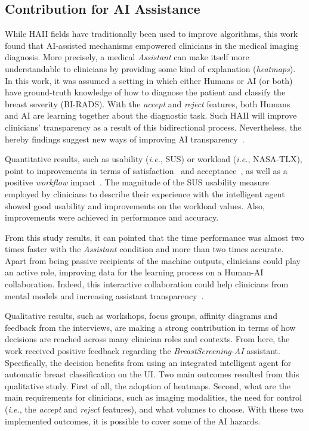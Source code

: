 \subsection{Contribution for AI Assistance}
\label{sec:chap005007002}

While \ac{HAII} fields have traditionally been used to improve algorithms, this work found that \ac{AI}-assisted mechanisms empowered clinicians in the medical imaging diagnosis.
More precisely, a medical {\it Assistant} can make itself more understandable to clinicians by providing some kind of explanation ({\it heatmaps}).
In this work, it was assumed a setting in which either Humans or \ac{AI} (or both) have ground-truth knowledge of how to diagnose the patient and classify the breast severity (\ac{BI-RADS}).
With the {\it accept} and {\it reject} features, both Humans and \ac{AI} are learning together about the diagnostic task.
Such \ac{HAII} will improve clinicians' transparency as a result of this bidirectional process.
Nevertheless, the hereby findings suggest new ways of improving \ac{AI} transparency~\cite{Cai:2019:EEE:3301275.3302289}.

Quantitative results, such as usability ({\it i.e.}, \ac{SUS}) or workload ({\it i.e.}, \ac{NASA-TLX}), point to improvements in terms of satisfaction~\cite{Bonham:2019:ARS:3308557.3308726} and acceptance~\cite{Sonntag:2012:RMD:2166966.2167031, Gambino:2019:DDR:3290607.3312916}, as well as a positive {\it workflow} impact~\cite{DeBackere:2015:DPR:2826165.2826229}.
The magnitude of the \ac{SUS} usability measure employed by clinicians to describe their experience with the intelligent agent showed good usability and improvements on the workload values.
Also, improvements were achieved in performance and accuracy.

From this study results, it can pointed that the time performance was almost two times faster with the {\it Assistant} condition and more than two times accurate.
Apart from being passive recipients of the machine outputs, clinicians could play an active role, improving data for the learning process on a Human-\ac{AI} collaboration.
Indeed, this interactive collaboration could help clinicians from mental models and increasing assistant transparency~\cite{amershi2014power, Cai:2019:HTC:3290605.3300234, Eslami:2016:FIL:2858036.2858494}.

Qualitative results, such as workshops, focus groups, affinity diagrams and feedback from the interviews, are making a strong contribution in terms of how decisions are rea\-ched across many clinician roles and contexts.
From here, the work received positive feedback regarding the {\it BreastScreening-AI} assistant.
Specifically, the decision benefits from using an integrated intelligent agent for automatic breast classification on the \ac{UI}.
Two main outcomes resulted from this qualitative study.
First of all, the adoption of heatmaps.
Second, what are the main requirements for clinicians, such as imaging modalities, the need for control ({\it i.e.}, the {\it accept} and {\it reject} features), and what volumes to choose.
With these two implemented outcomes, it is possible to cover some of the \ac{AI} hazards.

